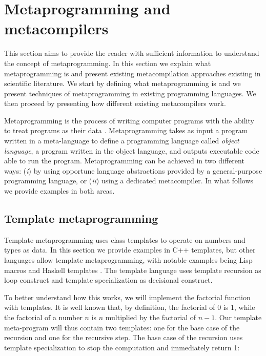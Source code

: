 \section{Metaprogramming and metacompilers}
\label{sec:ch_background_metaprogramming}
This section aims to provide the reader with sufficient information to understand the concept of metaprogramming. In this section we explain what metaprogramming is and present existing metacompilation approaches existing in scientific literature. We start by defining what metaprogramming is and we present techniques of metaprogramming in existing programming languages. We then proceed by presenting how different existing metacompilers work.

Metaprogramming is the process of writing computer programs with the ability to treat programs as their data \cite{czarnecki2000generative}. Metaprogramming takes as input a program written in a meta-language to define a programming language called \textit{object language}, a program written in the object language, and outputs executable code able to run the program. Metaprogramming can be achieved in two different ways: (\textit{i}) by using opportune language abstractions provided by a general-purpose programming language, or (\textit{ii}) using a dedicated metacompiler. In what follows we provide examples in both areas.

\subsection{Template metaprogramming}
\label{sec:ch_background_template_metaprogramming}
Template metaprogramming uses class templates to operate on numbers and types as data. In this section we provide examples in C++ templates, but other languages allow template metaprogramming, with notable examples being Lisp macros and Haskell templates \cite{sheard2002template}. The template language uses template recursion as loop construct and template specialization as decisional construct.

To better understand how this works, we will implement the factorial function with templates. It is well known that, by definition, the factorial of 0 is 1, while the factorial of a number $n$ is $n$ multiplied by the factorial of $n - 1$. Our template meta-program will thus contain two templates: one for the base case of the recursion and one for the recursive step. The base case of the recursion uses template specialization to stop the computation and immediately return 1:

